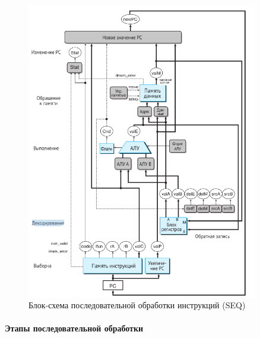 \documentclass[12pt,a4paper]{article}
\begin{document}
\begin{figure}[h!]
\centering
\includegraphics[width=0.9\textwidth]{seq.png}
\caption{Блок-схема последовательной обработки инструкций (SEQ)}
\label{fig:seq}
\end{figure}

\paragraph{Этапы последовательной обработки}
\end{document}
